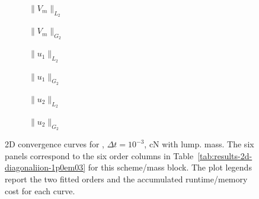 \begin{figure}[p]
\centering
\begin{subfigure}{0.485\linewidth}
\centering
{}
\caption{$\|V_m\|_{L_2}$}
\label{fig:results-2d-diagonaliion-1p0em03-cranknicolson-lumped-a}
\end{subfigure}
\hfill
\begin{subfigure}{0.485\linewidth}
\centering
{}
\caption{$\|V_m\|_{G_2}$}
\label{fig:results-2d-diagonaliion-1p0em03-cranknicolson-lumped-b}
\end{subfigure}
\par\vspace{0.8em}
\begin{subfigure}{0.485\linewidth}
\centering
{}
\caption{$\|u_1\|_{L_2}$}
\label{fig:results-2d-diagonaliion-1p0em03-cranknicolson-lumped-c}
\end{subfigure}
\hfill
\begin{subfigure}{0.485\linewidth}
\centering
{}
\caption{$\|u_1\|_{G_2}$}
\label{fig:results-2d-diagonaliion-1p0em03-cranknicolson-lumped-d}
\end{subfigure}
\par\vspace{0.8em}
\begin{subfigure}{0.485\linewidth}
\centering
{}
\caption{$\|u_2\|_{L_2}$}
\label{fig:results-2d-diagonaliion-1p0em03-cranknicolson-lumped-e}
\end{subfigure}
\hfill
\begin{subfigure}{0.485\linewidth}
\centering
{}
\caption{$\|u_2\|_{G_2}$}
\label{fig:results-2d-diagonaliion-1p0em03-cranknicolson-lumped-f}
\end{subfigure}
\caption{2D convergence curves for , $\Delta t=10^{-3}$, cN with lump. mass. The six panels correspond to the six order columns in Table~\ref{tab:results-2d-diagonaliion-1p0em03} for this scheme/mass block. The plot legends report the two fitted orders and the accumulated runtime/memory cost for each curve.}
\label{fig:results-2d-diagonaliion-1p0em03-cranknicolson-lumped}
\end{figure}
\FloatBarrier

